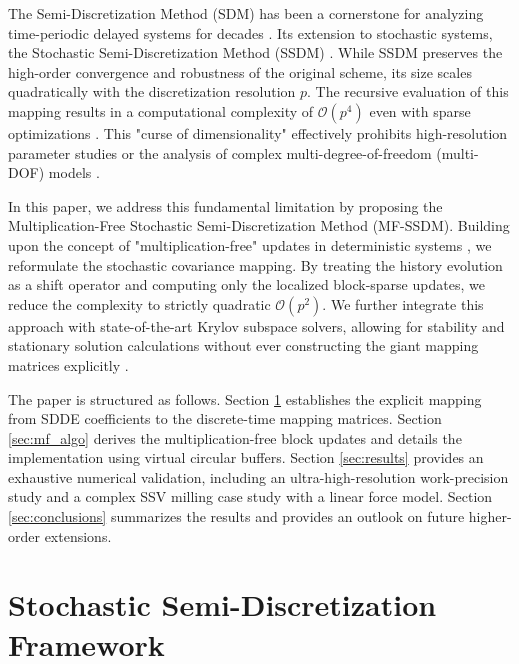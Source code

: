 \documentclass[preprint,12pt]{elsarticle}
\begin{document}
The Semi-Discretization Method (SDM) has been a cornerstone for analyzing time-periodic delayed systems for decades \cite{Insperger2002, Insperger2011, Bachrathy2012, Bachrathy2016}. Its extension to stochastic systems, the Stochastic Semi-Discretization Method (SSDM) \cite{Sykora2019, Sykora2020a, Sykora2020b, Sykora2021, Zhao2024, Zhou2024, Liu2023, Wang2022}. While SSDM preserves the high-order convergence and robustness of the original scheme, its size scales quadratically with the discretization resolution $p$. The recursive evaluation of this mapping results in a computational complexity of $\mathcal{O}(p^4)$ even with sparse optimizations \cite{Sykora2019}. This "curse of dimensionality" effectively prohibits high-resolution parameter studies or the analysis of complex multi-degree-of-freedom (multi-DOF) models \cite{Ren2021, Ding2024, Liu2021, Ritto2020, Ma2022, Ren2024, Zhou2024}.

In this paper, we address this fundamental limitation by proposing the Multiplication-Free Stochastic Semi-Discretization Method (MF-SSDM). Building upon the concept of "multiplication-free" updates in deterministic systems \cite{Bachrathy2012, Bachrathy2016}, we reformulate the stochastic covariance mapping. By treating the history evolution as a shift operator and computing only the localized block-sparse updates, we reduce the complexity to strictly quadratic $\mathcal{O}(p^2)$. We further integrate this approach with state-of-the-art Krylov subspace solvers, allowing for stability and stationary solution calculations without ever constructing the giant mapping matrices explicitly \cite{Saad1986, Zhou2024, Haegeman2021, Roberts1986, Namachchivaya1990}.

The paper is structured as follows. Section \ref{sec:theory} establishes the explicit mapping from SDDE coefficients to the discrete-time mapping matrices. Section \ref{sec:mf_algo} derives the multiplication-free block updates and details the implementation using virtual circular buffers. Section \ref{sec:results} provides an exhaustive numerical validation, including an ultra-high-resolution work-precision study and a complex SSV milling case study with a linear force model. Section \ref{sec:conclusions} summarizes the results and provides an outlook on future higher-order extensions.

\section{Stochastic Semi-Discretization Framework}
\label{sec:theory}
\end{document}
